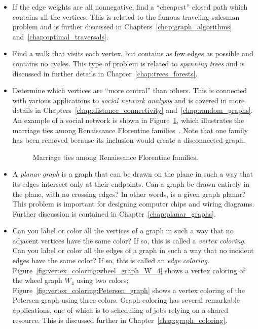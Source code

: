 \begin{itemize}
\item If the edge weights are all nonnegative, find a ``cheapest''
  closed path which contains all the vertices. This is related to the
  famous traveling salesman problem
  and is further discussed in Chapters~\ref{chap:graph_algorithms}
  and~\ref{chap:optimal_traversals}.

\item Find a walk that visits each vertex, but contains as few edges
  as possible and contains no cycles. This type of problem is related
  to \emph{spanning trees} and is discussed in
  further details in Chapter~\ref{chap:trees_forests}.

\item Determine which vertices are ``more central'' than others. This
  is connected with various applications to
  \emph{social network analysis} and is
  covered in more details in Chapters~\ref{chap:distance_connectivity}
  and~\ref{chap:random_graphs}. An example of a social network is shown
  in Figure~\ref{fig:introduction:marriage_ties_Renaissance}, which
  illustrates the marriage ties among
  Renaissance Florentine
  families~\cite{Borgatti2005}. Note that one family has been removed
  because its inclusion would create a disconnected graph.

\begin{figure}[!htbp]
\centering
{}

\caption{Marriage ties among Renaissance Florentine families.}
\label{fig:introduction:marriage_ties_Renaissance}
\end{figure}

\item A \emph{planar graph} is a graph that can be
  drawn on the plane in such a way that its edges intersect only at
  their endpoints. Can a graph be drawn entirely in the plane, with no
  crossing edges? In other words, is a given graph planar? This
  problem is important for designing computer chips and wiring
  diagrams. Further discussion is contained in
  Chapter~\ref{chap:planar_graphs}.

\item Can you label or color all the vertices of a graph in such a
  way that no adjacent vertices have the same color? If so, this is
  called a \emph{vertex coloring}. Can you
  label or color all the edges of a graph in such a way that no
  incident edges have the same color? If so, this is called an
  \emph{edge coloring}.
  Figure~\ref{fig:vertex_coloring:wheel_graph_W_4} shows a vertex
  coloring of the wheel graph $W_4$ using two
  colors; Figure~\ref{fig:vertex_coloring:Petersen_graph} shows a
  vertex coloring of the Petersen graph using
  three colors. Graph coloring has several remarkable applications,
  one of which is to scheduling of jobs relying on a shared
  resource. This is discussed further in
  Chapter~\ref{chap:graph_coloring}.


\end{itemize}
